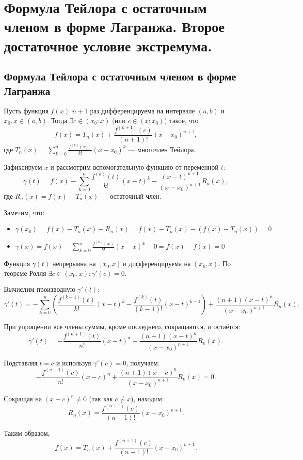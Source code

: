 \section{Формула Тейлора с остаточным членом в форме Лагранжа. Второе достаточное условие экстремума.}

\subsection{Формула Тейлора с остаточным членом в форме Лагранжа}

\begin{theorem}
    Пусть функция \(f(x)\) \(n+1\) раз дифференцируема на интервале \((a, b)\) и \(x_0, x \in (a, b)\). 
    Тогда \(\exists c \in (x_0; x)\) (или \(c \in (x; x_0)\)) такое, что
    \[
    f(x) = T_n(x) + \frac{f^{(n+1)}(c)}{(n+1)!} (x - x_0)^{n+1},
    \]
    где \(T_n(x) = \sum_{k=0}^n \frac{f^{(k)}(x_0)}{k!} (x - x_0)^k\) — многочлен Тейлора.
\end{theorem}

\begin{Proof}
    Зафиксируем \(x\) и рассмотрим вспомогательную функцию от переменной \(t\):
    \[
    \gamma(t) = f(x) - \sum_{k=0}^n \frac{f^{(k)}(t)}{k!} (x - t)^k - \frac{(x - t)^{n+1}}{(x - x_0)^{n+1}} R_n(x),
    \]
    где \(R_n(x) = f(x) - T_n(x)\) — остаточный член.
    
    Заметим, что:
    \begin{itemize}
        \item \(\gamma(x_0) = f(x) - T_n(x) - R_n(x) = f(x) - T_n(x) - (f(x) - T_n(x)) = 0\)
        \item \(\gamma(x) = f(x) - \sum_{k=0}^n \frac{f^{(k)}(x)}{k!} (x - x)^k - 0 = f(x) - f(x) = 0\)
    \end{itemize}
    
    Функция \(\gamma(t)\) непрерывна на \([x_0, x]\) и дифференцируема на \((x_0, x)\). 
    По теореме Ролля \(\exists c \in (x_0, x): \gamma'(c) = 0\).
    
    Вычислим производную \(\gamma'(t)\):
    \[
    \gamma'(t) = -\sum_{k=0}^n \left( \frac{f^{(k+1)}(t)}{k!} (x - t)^k - \frac{f^{(k)}(t)}{(k-1)!} (x - t)^{k-1} \right) + \frac{(n+1)(x - t)^n}{(x - x_0)^{n+1}} R_n(x).
    \]
    
    При упрощении все члены суммы, кроме последнего, сокращаются, и остаётся:
    \[
    \gamma'(t) = -\frac{f^{(n+1)}(t)}{n!} (x - t)^n + \frac{(n+1)(x - t)^n}{(x - x_0)^{n+1}} R_n(x).
    \]
    
    Подставляя \(t = c\) и используя \(\gamma'(c) = 0\), получаем:
    \[
    -\frac{f^{(n+1)}(c)}{n!} (x - c)^n + \frac{(n+1)(x - c)^n}{(x - x_0)^{n+1}} R_n(x) = 0.
    \]
    
    Сокращая на \((x - c)^n \neq 0\) (так как \(c \neq x\)), находим:
    \[
    R_n(x) = \frac{f^{(n+1)}(c)}{(n+1)!} (x - x_0)^{n+1}.
    \]
    
    Таким образом,
    \[
    f(x) = T_n(x) + \frac{f^{(n+1)}(c)}{(n+1)!} (x - x_0)^{n+1}.
    \]
\end{Proof}

